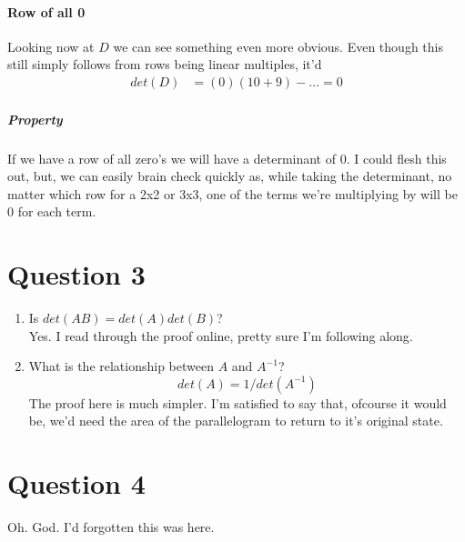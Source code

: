 \documentclass{article}
\begin{document}
      \paragraph{Row of all 0}
          Looking now at $D$ we can see something even more obvious.
          Even though this still simply follows from rows being linear multiples, it'd
          \begin{align*}
            det(D)&=(0)(10+9)-\dots=0
          \end{align*}
        \subparagraph{Property}
          If we have a row of all zero's we will have a determinant of 0.
          I could flesh this out, but, we can easily brain check quickly as,
          while taking the determinant, no matter which row for a 2x2 or 3x3,
          one of the terms we're multiplying by will be 0 for each term.
  \section{Question 3}
    \begin{enumerate}[label=(\alph*)]
      \item Is $det(AB)=det(A)det(B)$? \\
        Yes. I read through the proof online, pretty sure I'm following along.
      \item What is the relationship between $A$ and $A^{-1}$?
        \[det(A)=1/det(A^{-1})\]
        The proof here is much simpler. I'm satisfied to say that, ofcourse it would be,
        we'd need the area of the parallelogram to return to it's original state.
    \end{enumerate}
  \section{Question 4}
    Oh. God. I'd forgotten this was here.
\end{document}
